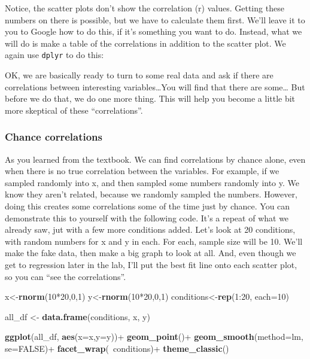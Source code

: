 \documentclass[]{book}
\newenvironment{Shaded}{\begin{snugshade}}{\end{snugshade}}
\newcommand{\KeywordTok}[1]{\textcolor[rgb]{0.13,0.29,0.53}{\textbf{{#1}}}}
\newcommand{\DataTypeTok}[1]{\textcolor[rgb]{0.13,0.29,0.53}{{#1}}}
\newcommand{\DecValTok}[1]{\textcolor[rgb]{0.00,0.00,0.81}{{#1}}}
\newcommand{\StringTok}[1]{\textcolor[rgb]{0.31,0.60,0.02}{{#1}}}
\newcommand{\OtherTok}[1]{\textcolor[rgb]{0.56,0.35,0.01}{{#1}}}
\newcommand{\NormalTok}[1]{{#1}}
\theoremstyle{definition}
\theoremstyle{definition}
\theoremstyle{definition}
\theoremstyle{remark}
\begin{document}
Notice, the scatter plots don't show the correlation (r) values. Getting
these numbers on there is possible, but we have to calculate them first.
We'll leave it to you to Google how to do this, if it's something you
want to do. Instead, what we will do is make a table of the correlations
in addition to the scatter plot. We again use \texttt{dplyr} to do this:

OK, we are basically ready to turn to some real data and ask if there
are correlations between interesting variables\ldots{}You will find that
there are some\ldots{} But before we do that, we do one more thing. This
will help you become a little bit more skeptical of these
``correlations''.

\subsubsection{Chance correlations}\label{chance-correlations}

As you learned from the textbook. We can find correlations by chance
alone, even when there is no true correlation between the variables. For
example, if we sampled randomly into x, and then sampled some numbers
randomly into y. We know they aren't related, because we randomly
sampled the numbers. However, doing this creates some correlations some
of the time just by chance. You can demonstrate this to yourself with
the following code. It's a repeat of what we already saw, jut with a few
more conditions added. Let's look at 20 conditions, with random numbers
for x and y in each. For each, sample size will be 10. We'll make the
fake data, then make a big graph to look at all. And, even though we get
to regression later in the lab, I'll put the best fit line onto each
scatter plot, so you can ``see the correlations''.

\begin{Shaded}
\begin{Highlighting}[]
\NormalTok{x<-}\KeywordTok{rnorm}\NormalTok{(}\DecValTok{10}\NormalTok{*}\DecValTok{20}\NormalTok{,}\DecValTok{0}\NormalTok{,}\DecValTok{1}\NormalTok{)}
\NormalTok{y<-}\KeywordTok{rnorm}\NormalTok{(}\DecValTok{10}\NormalTok{*}\DecValTok{20}\NormalTok{,}\DecValTok{0}\NormalTok{,}\DecValTok{1}\NormalTok{)}
\NormalTok{conditions<-}\KeywordTok{rep}\NormalTok{(}\DecValTok{1}\NormalTok{:}\DecValTok{20}\NormalTok{, }\DataTypeTok{each=}\DecValTok{10}\NormalTok{)}

\NormalTok{all_df <-}\StringTok{ }\KeywordTok{data.frame}\NormalTok{(conditions, x, y)}

\KeywordTok{ggplot}\NormalTok{(all_df, }\KeywordTok{aes}\NormalTok{(}\DataTypeTok{x=}\NormalTok{x,}\DataTypeTok{y=}\NormalTok{y))+}
\StringTok{  }\KeywordTok{geom_point}\NormalTok{()+}
\StringTok{  }\KeywordTok{geom_smooth}\NormalTok{(}\DataTypeTok{method=}\NormalTok{lm, }\DataTypeTok{se=}\OtherTok{FALSE}\NormalTok{)+}
\StringTok{  }\KeywordTok{facet_wrap}\NormalTok{(~conditions)+}
\StringTok{  }\KeywordTok{theme_classic}\NormalTok{()}
\end{Highlighting}
\end{Shaded}
\end{document}
